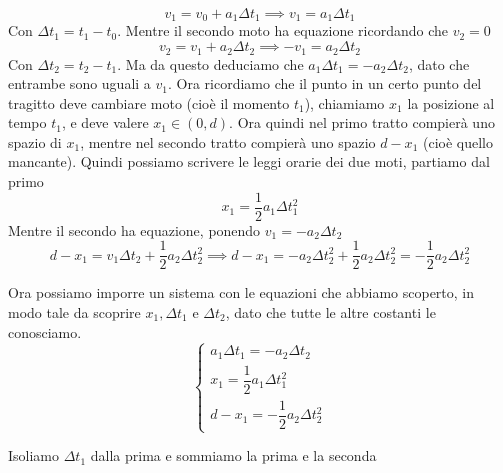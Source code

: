 \documentclass{rapport}
\begin{document}
\[
v_1 = v_0 + a_1\Delta t_1 \implies v_1 = a_1\Delta t_1
\]
Con $\Delta t_1 = t_1-t_0$. Mentre il secondo moto ha equazione ricordando che $v_2 = 0$
\[
v_2 = v_1 + a_2\Delta t_2 \implies -v_1 = a_2\Delta t_2
\]
Con $\Delta t_2 = t_2-t_1$. Ma da questo deduciamo che $a_1\Delta t_1 = -a_2\Delta t_2$, dato che entrambe sono uguali a $v_1$. Ora ricordiamo che il punto in un certo punto del tragitto deve cambiare moto (cioè il momento $t_1$), chiamiamo $x_1$ la posizione al tempo $t_1$, e deve valere $x_1 \in (0, d)$. Ora quindi nel primo tratto compierà uno spazio di $x_1$, mentre nel secondo tratto compierà uno spazio $d-x_1$ (cioè quello mancante). Quindi possiamo scrivere le leggi orarie dei due moti, partiamo dal primo
\[
x_1 = \dfrac{1}{2}a_1\Delta t_1^2
\] 
Mentre il secondo ha equazione, ponendo $v_1 = -a_2\Delta t_2$
\[
d-x_1 = v_1\Delta t_2 + \dfrac{1}{2}a_2\Delta t_2^2 \implies d-x_1 = -a_2\Delta t_2^2 + \dfrac{1}{2}a_2\Delta t_2^2 =  -\dfrac{1}{2}a_2\Delta t_2^2
\]

Ora possiamo imporre un sistema con le equazioni che abbiamo scoperto, in modo tale da scoprire $x_1, \Delta t_1$ e $\Delta t_2$, dato che tutte le altre costanti le conosciamo.
\[
\begin{cases}
  a_1\Delta t_1 = -a_2\Delta t_2 \\
  x_1 = \dfrac{1}{2}a_1\Delta t_1^2 \\
  d-x_1 =  -\dfrac{1}{2}a_2\Delta t_2^2
\end{cases}
\]

Isoliamo $\Delta t_1$ dalla prima e sommiamo la prima e la seconda 
\end{document}
